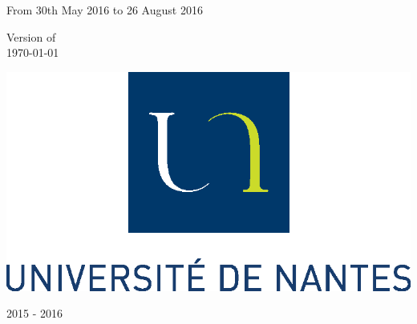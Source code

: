 \begin{titlepage}
\begin{center}



\vfill





\Large{From 30th May 2016 to 26 August 2016}

\vfill

\large{Version of} \\
\large{\today} 

\vfill

\includegraphics[scale=0.6]{images/logo_ecoles/Universite_de_Nantes_} 

\large{2015 - 2016} 





\end{center}

\end{titlepage}